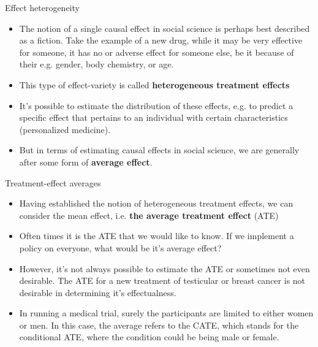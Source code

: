 \documentclass[notes,11pt, aspectratio=169]{beamer}
\begin{document}
\begin{frame}{Effect heterogeneity}
\begin{itemize}
    \item The notion of a single causal effect in social science is  perhaps best described as a fiction. Take the example of a new drug, while it may be very effective for someone, it has no or adverse effect for someone else, be it because of their e.g. gender, body chemistry, or age. 
    \item This type of effect-variety is called \textbf{heterogeneous treatment effects}
    \item It's possible to estimate the distribution of these effects, e.g. to predict a specific effect that pertains to an individual with certain characteristics (personalized medicine).
    \item But in terms of estimating causal effects in social science, we are generally after some form of \textbf{average effect}.
\end{itemize}
\end{frame}

\begin{frame}{Treatment-effect averages}
\begin{itemize}
    \item Having established the notion of heterogeneous treatment effects, we can consider the mean effect, i.e. \textbf{the average treatment effect} (ATE)
    \item Often times it is the ATE that we would like to know. If we implement a policy on everyone, what would be it's average effect?

    \item However, it's not always possible to estimate the ATE or sometimes not even desirable. The ATE for a new treatment of testicular or breast cancer is not desirable in determining it's effectualness.

    \item In running a medical trial, surely the participants are limited to either women or men. In this case, the average refers to the CATE, which stands for the conditional ATE, where the condition could be being male or female.
\end{itemize}
\end{frame}
\end{document}
